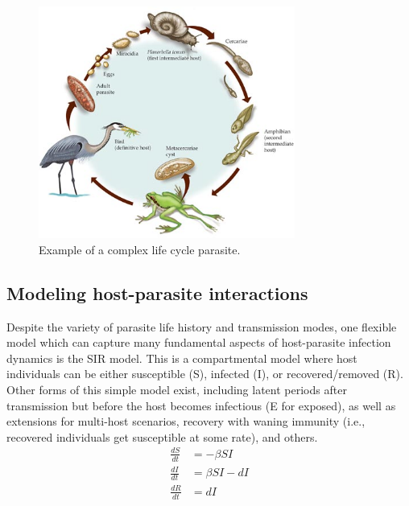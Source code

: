 \documentclass[12pt]{article}
\begin{document}
\begin{figure}
\includegraphics[width=0.75\textwidth]{figs/IndirectLifeCycle.jpg}
\caption{Example of a complex life cycle parasite.}
\end{figure}

















\bigskip
\subsection*{Modeling host-parasite interactions}

Despite the variety of parasite life history and transmission modes, one flexible model which can capture many fundamental aspects of host-parasite infection dynamics is the SIR model. This is a compartmental model where host individuals can be either susceptible (S), infected (I), or recovered/removed (R). Other forms of this simple model exist, including latent periods after transmission but before the host becomes infectious (E for exposed), as well as extensions for multi-host scenarios, recovery with waning immunity (i.e., recovered individuals get susceptible at some rate), and others. \\


\begin{align}
\frac{dS}{dt} &=  -\beta SI\\
\frac{dI}{dt} &=  \beta SI - dI \\
\frac{dR}{dt} &=  dI
\end{align}
\end{document}
